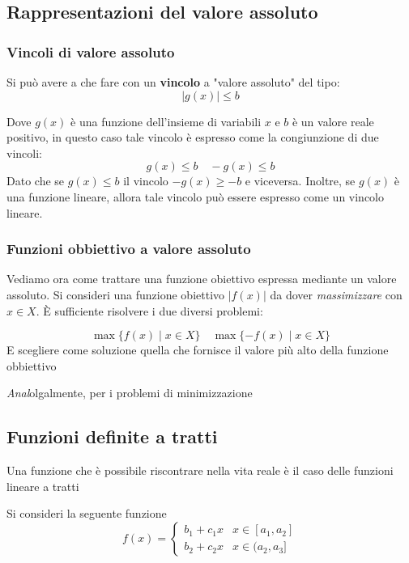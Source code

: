 
\subsection{Rappresentazioni del valore assoluto}

\subsubsection{Vincoli di valore assoluto}
Si può avere a che fare con un \textbf{vincolo} a "valore assoluto" del tipo:
\[
  |g(x)| \leq b
\]

Dove $g(x)$ è una funzione dell'insieme di variabili $x$ e $b$ è un valore reale positivo, in questo caso tale vincolo è espresso come la congiunzione di due vincoli:
\[
  g(x)\leq b \quad -g(x)\leq b
\]
Dato che se $g(x)\leq b$ il vincolo $-g(x)\geq -b$ e viceversa. Inoltre, se $g(x)$ è una funzione lineare, allora tale vincolo può essere espresso come un vincolo lineare.

\subsubsection{Funzioni obbiettivo a valore assoluto}
Vediamo ora come trattare una funzione obiettivo espressa mediante un valore assoluto. Si consideri una funzione obiettivo $|f(x)|$ da dover \textit{massimizzare} con $x\in X$. È sufficiente risolvere i due diversi problemi:

\[
  \max \{f(x)\mid x \in X\} \quad \max \{-f(x)\mid x \in X\}
\]
E scegliere come soluzione quella che fornisce il valore più alto della funzione obbiettivo

\textit{Anal}olgalmente, per i problemi di minimizzazione

\subsection{Funzioni definite a tratti}
Una funzione che è possibile riscontrare nella vita reale è il caso delle funzioni lineare a tratti

Si consideri la seguente funzione 
\begin{equation}
  f(x) = \begin{cases}
    b_1 + c_1x & x \in [a_1, a_2]\\
    b_2+c_2x & x \in (a_2, a_3]
  \end{cases}
\end{equation}

